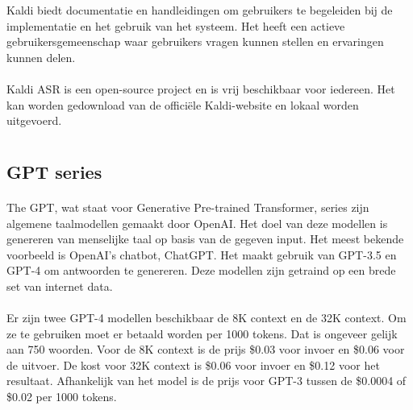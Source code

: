 Kaldi biedt documentatie en handleidingen om gebruikers te begeleiden bij de implementatie en het gebruik van het systeem. Het heeft een actieve gebruikersgemeenschap waar gebruikers vragen kunnen stellen en ervaringen kunnen delen.

\paragraph{}
Kaldi ASR is een open-source project en is vrij beschikbaar voor iedereen. Het kan worden gedownload van de officiële Kaldi-website en lokaal worden uitgevoerd.


\section{} \label{sec:Natural Language Classifier}%

\subsection{GPT series}%

\paragraph{}
The GPT, wat staat voor Generative Pre-trained Transformer, series zijn algemene taalmodellen gemaakt door OpenAI. Het doel van deze modellen is genereren van menselijke taal op basis van de gegeven input. Het meest bekende voorbeeld is OpenAI's chatbot, ChatGPT. Het  maakt gebruik van GPT-3.5 en GPT-4 om antwoorden te genereren. Deze modellen zijn getraind op een brede set van internet data.

\paragraph{}
Er zijn twee GPT-4 modellen beschikbaar de 8K context en de 32K context. Om ze te gebruiken moet er betaald worden per 1000 tokens. Dat is ongeveer gelijk aan 750 woorden. Voor de 8K context is de prijs \$0.03 voor invoer en \$0.06 voor de uitvoer. De kost voor 32K context is \$0.06 voor invoer en \$0.12 voor het resultaat. Afhankelijk van het model is de prijs voor GPT-3 tussen de \$0.0004 of \$0.02 per 1000 tokens.

